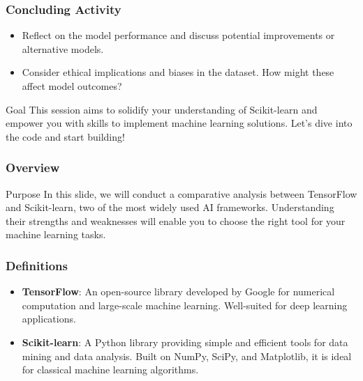 \documentclass[aspectratio=169]{beamer}
\begin{document}
\begin{frame}
    \frametitle{Concluding Activity}
    \begin{itemize}
        \item Reflect on the model performance and discuss potential improvements or alternative models.
        \item Consider ethical implications and biases in the dataset. How might these affect model outcomes?
    \end{itemize}
    \begin{block}{Goal}
        This session aims to solidify your understanding of Scikit-learn and empower you with skills to implement machine learning solutions. Let’s dive into the code and start building!
    \end{block}
\end{frame}

\begin{frame}[fragile]
    \frametitle{Overview}
    \begin{block}{Purpose}
        In this slide, we will conduct a comparative analysis between TensorFlow and Scikit-learn, two of the most widely used AI frameworks. Understanding their strengths and weaknesses will enable you to choose the right tool for your machine learning tasks.
    \end{block}
\end{frame}

\begin{frame}[fragile]
    \frametitle{Definitions}
    \begin{itemize}
        \item \textbf{TensorFlow}: An open-source library developed by Google for numerical computation and large-scale machine learning. Well-suited for deep learning applications.
        \item \textbf{Scikit-learn}: A Python library providing simple and efficient tools for data mining and data analysis. Built on NumPy, SciPy, and Matplotlib, it is ideal for classical machine learning algorithms.
    \end{itemize}
\end{frame}
\end{document}
